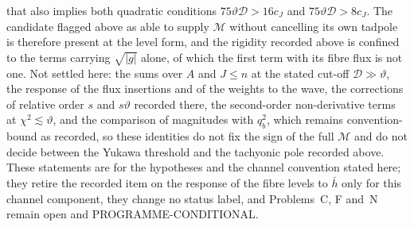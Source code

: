 that also implies both quadratic conditions \(75\vartheta\mathcal D>16c_J\) and \(75\vartheta\mathcal D>8c_J\). The candidate flagged above as able to supply \(\mathcal M\) without cancelling its own tadpole is therefore present at the level form, and the rigidity recorded above is confined to the terms carrying \(\sqrt{|g|}\) alone, of which the first term with its fibre flux is not one. Not settled here: the sums over \(A\) and \(J\le n\) at the stated cut-off \(\mathcal D\gg\vartheta\), the response of the flux insertions and of the weights to the wave, the corrections of relative order \(s\) and \(s\vartheta\) recorded there, the second-order non-derivative terms at \(\chi^2\lesssim\vartheta\), and the comparison of magnitudes with \(q_b^2\), which remains convention-bound as recorded, so these identities do not fix the sign of the full \(\mathcal M\) and do not decide between the Yukawa threshold and the tachyonic pole recorded above. These statements are for the hypotheses and the channel convention stated here; they retire the recorded item on the response of the fibre levels to \(\bar h\) only for this channel component, they change no status label, and Problems~C, F and~N remain open and PROGRAMME-CONDITIONAL.

